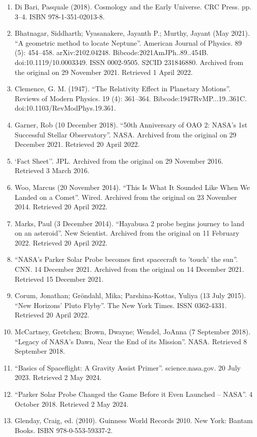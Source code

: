 \begin{enumerate}
\item Di Bari, Pasquale (2018). Cosmology and the Early Universe. CRC Press. pp. 3–4. ISBN 978-1-351-02013-8.
\item Bhatnagar, Siddharth; Vyasanakere, Jayanth P.; Murthy, Jayant (May 2021). ``A geometric method to locate Neptune''. American Journal of Physics. 89 (5): 454–458. arXiv:2102.04248. Bibcode:2021AmJPh..89..454B. doi:10.1119/10.0003349. ISSN 0002-9505. S2CID 231846880. Archived from the original on 29 November 2021. Retrieved 1 April 2022.
\item Clemence, G. M. (1947). ``The Relativity Effect in Planetary Motions''. Reviews of Modern Physics. 19 (4): 361–364. Bibcode:1947RvMP...19..361C. doi:10.1103/RevModPhys.19.361.
\item Garner, Rob (10 December 2018). ``50th Anniversary of OAO 2: NASA's 1st Successful Stellar Observatory''. NASA. Archived from the original on 29 December 2021. Retrieved 20 April 2022.
\item `Fact Sheet''. JPL. Archived from the original on 29 November 2016. Retrieved 3 March 2016.
\item Woo, Marcus (20 November 2014). ``This Is What It Sounded Like When We Landed on a Comet''. Wired. Archived from the original on 23 November 2014. Retrieved 20 April 2022.
\item Marks, Paul (3 December 2014). ``Hayabusa 2 probe begins journey to land on an asteroid''. New Scientist. Archived from the original on 11 February 2022. Retrieved 20 April 2022.
\item ``NASA's Parker Solar Probe becomes first spacecraft to 'touch' the sun''. CNN. 14 December 2021. Archived from the original on 14 December 2021. Retrieved 15 December 2021.
\item Corum, Jonathan; Gröndahl, Mika; Parshina-Kottas, Yuliya (13 July 2015). ``New Horizons' Pluto Flyby''. The New York Times. ISSN 0362-4331. Retrieved 20 April 2022.
\item McCartney, Gretchen; Brown, Dwayne; Wendel, JoAnna (7 September 2018). ``Legacy of NASA's Dawn, Near the End of its Mission''. NASA. Retrieved 8 September 2018.
\item ``Basics of Spaceflight: A Gravity Assist Primer''. science.nasa.gov. 20 July 2023. Retrieved 2 May 2024.
\item ``Parker Solar Probe Changed the Game Before it Even Launched – NASA''. 4 October 2018. Retrieved 2 May 2024.
\item Glenday, Craig, ed. (2010). Guinness World Records 2010. New York: Bantam Books. ISBN 978-0-553-59337-2.

\end{enumerate}
